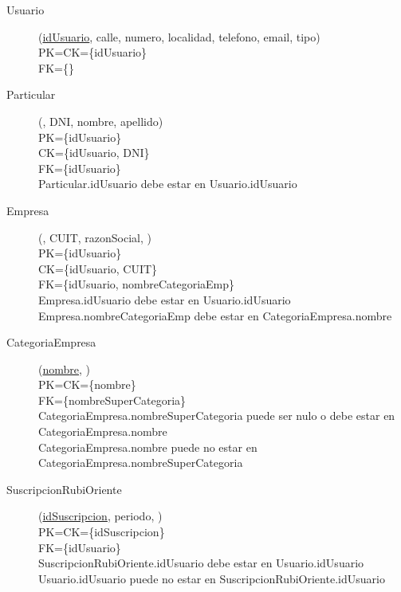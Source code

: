 \begin{description}

 \item[Usuario](\underline{idUsuario}, calle, numero, localidad, telefono, email, tipo)\\
PK=CK=\{idUsuario\}\\
FK=\{\}

 \item[Particular](\underline{}, DNI, nombre, apellido)\\
PK=\{idUsuario\}\\
CK=\{idUsuario, DNI\}\\
FK=\{idUsuario\}\\
Particular.idUsuario debe estar en Usuario.idUsuario

 \item[Empresa](\underline{}, CUIT, razonSocial, )\\
PK=\{idUsuario\}\\
CK=\{idUsuario, CUIT\}\\
FK=\{idUsuario, nombreCategoriaEmp\}\\
Empresa.idUsuario debe estar en Usuario.idUsuario\\
Empresa.nombreCategoriaEmp debe estar en CategoriaEmpresa.nombre

 \item[CategoriaEmpresa](\underline{nombre}, )\\
PK=CK=\{nombre\}\\
FK=\{nombreSuperCategoria\}\\
CategoriaEmpresa.nombreSuperCategoria puede ser nulo o debe estar en CategoriaEmpresa.nombre\\
CategoriaEmpresa.nombre puede no estar en CategoriaEmpresa.nombreSuperCategoria

 \item[SuscripcionRubiOriente](\underline{idSuscripcion}, periodo, )\\
PK=CK=\{idSuscripcion\}\\
FK=\{idUsuario\}\\
SuscripcionRubiOriente.idUsuario debe estar en Usuario.idUsuario\\
Usuario.idUsuario puede no estar en SuscripcionRubiOriente.idUsuario


\end{description}
